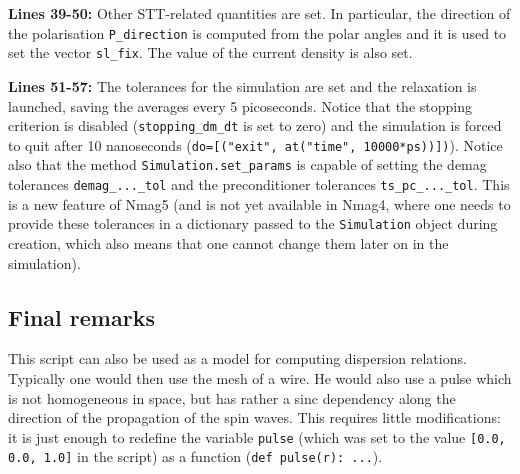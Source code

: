 \documentclass[11pt,oneside,openany]{article}
\begin{document}
\textbf{Lines 39-50:} Other STT-related quantities are set. In particular,
the direction of the polarisation \verb|P_direction| is computed from the
polar angles and it is used to set the vector \verb|sl_fix|.
The value of the current density is also set. 

\textbf{Lines 51-57:} The tolerances for the simulation are set
and the relaxation is launched, saving the averages every 5 picoseconds.
Notice that the stopping criterion is disabled (\verb|stopping_dm_dt| is set
to zero) and the simulation is forced to quit after 10 nanoseconds
(\verb|do=[("exit", at("time", 10000*ps))])|).
Notice also that the method \verb|Simulation.set_params| is capable
of setting the demag tolerances \verb|demag_..._tol| and the preconditioner
tolerances \verb|ts_pc_..._tol|. This is a new feature of Nmag5 (and is
not yet available in Nmag4, where one needs to provide these tolerances
in a dictionary passed to the \verb|Simulation| object during creation,
which also means that one cannot change them later on in the simulation).


%
%
%

\subsection{Final remarks}
This script can also be used as a model for computing dispersion relations.
Typically one would then use the mesh of a wire.  He would also use a pulse
which is not homogeneous in space, but has rather a sinc dependency along the
direction of the propagation of the spin waves. This requires little
modifications: it is just enough to redefine the variable \verb|pulse| (which
was set to the value \verb|[0.0, 0.0, 1.0]| in the script) as a function
(\verb|def pulse(r): ...|).
\end{document}

